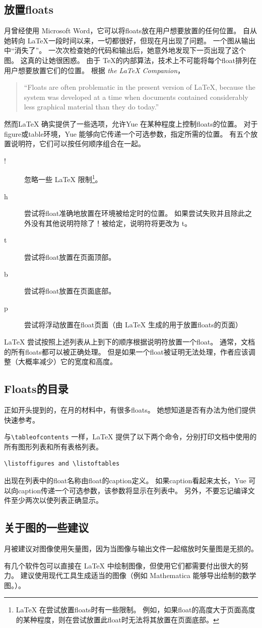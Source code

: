 \subsection{放置floats}
月曾经使用 Microsoft Word，它可以将floats放在用户想要放置的任何位置。 自从她转向 \LaTeX 一段时间以来，一切都很好，但现在月出现了问题。 一个图从输出中“消失了”。 一次次检查她的代码和输出后，她意外地发现下一页出现了这个图。 这真的让她很困惑。 由于 \TeX 的内部算法，技术上不可能将每个float排列在用户想要放置它们的位置。 根据 \textit{the \LaTeX{} Companion}，
\begin{quotation}
``Floats are often problematic in the present version of \LaTeX, because the system was developed at a time when documents contained considerably less graphical material than they do today.''
\end{quotation}

然而\LaTeX{} 确实提供了一些选项，允许Yue 在某种程度上控制floats的位置。 对于figure或table环境，Yue 能够向它传递一个可选参数，指定所需的位置。 有五个放置说明符，它们可以按任何顺序组合在一起。
\begin{description}
\item[!] 忽略一些 \LaTeX{} 限制\footnote{\LaTeX{} 在尝试放置floats时有一些限制。 例如，如果float的高度大于页面高度的某种程度，则在尝试放置此float时无法将其放置在页面底部。}。
\item[h] 尝试将float准确地放置在环境被给定时的位置。 如果尝试失败并且除此之外没有其他说明符除了！被给定，说明符将更改为 t。
\item[t] 尝试将float放置在页面顶部。
\item[b] 尝试将float放置在页面底部。
\item[p] 尝试将浮动放置在float页面（由 \LaTeX{} 生成的用于放置floats的页面）
\end{description}
\LaTeX{} 尝试按照上述列表从上到下的顺序根据说明符放置一个float。 通常，文档的所有floats都可以被正确处理。 但是如果一个float被证明无法处理，作者应该调整（大概率减少）它的宽度和高度。

\subsection{Floats的目录}
正如开头提到的，在月的材料中，有很多floats。 她想知道是否有办法为他们提供快速参考。

与\verb=\tableofcontents= 一样，\LaTeX{} 提供了以下两个命令，分别打印文档中使用的所有图形列表和所有表格列表。
\begin{verbatim}
\listoffigures and \listoftables
\end{verbatim}
出现在列表中的float名称由float的caption定义。 如果caption看起来太长，Yue 可以向caption传递一个可选参数，该参数将显示在列表中。 另外，不要忘记编译文件至少两次以使列表正确显示。

\subsection{关于图的一些建议}
月被建议对图像使用矢量图，因为当图像与输出文件一起缩放时矢量图是无损的。

有几个软件包可以直接在 \LaTeX{} 中绘制图像，但使用它们都需要付出很大的努力。 建议使用现代工具生成适当的图像（例如 Mathematica 能够导出绘制的数学图。）。